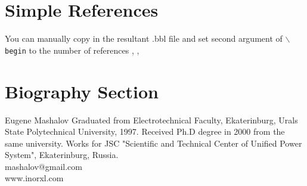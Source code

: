 \documentclass[lettersize,journal]{IEEEtran}
\begin{document}
%
\section{Simple References}
You can manually copy in the resultant .bbl file and set second argument of $\backslash${\tt{begin}} to the number of references \cite{cellier06}, \cite{gear71}, \cite{mixedadams} \cite{hairer93}
\cite{mycompiler} \cite{petzold82} \cite{Radhakrishnan1993} \cite{Moore1994} \cite{Lee2015}
\cite{Hiskens01}  \cite{VanCutsem2020} \cite{Murad2019}
\cite{Canay93} \cite{Filippov1988} \cite{mycompression} 





\newpage
\section{Biography Section}
\vspace{-33pt}
\begin{IEEEbiography}{Eugene Mashalov}
Graduated from Electrotechnical Faculty, Ekaterinburg, Urals State Polytechnical University, 1997. 
Received Ph.D degree in 2000 from the same university. 
Works for JSC "Scientific and Technical Center of Unified Power System", Ekaterinburg, Russia.\\
mashalov@gmail.com \\
www.inorxl.com
\end{IEEEbiography}
\vfill
\end{document}
